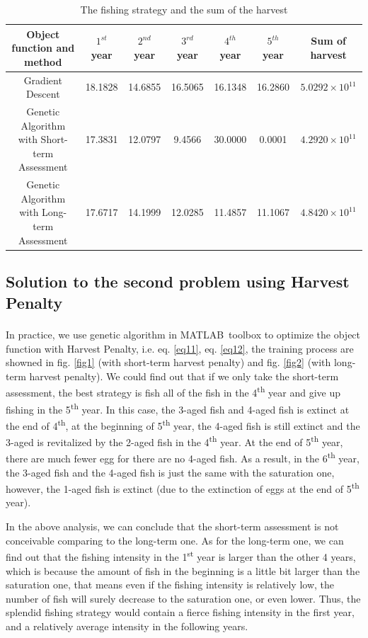 \documentclass{IEEEtran}
\begin{document}
\begin{table}
    \normalsize
    \caption{The fishing strategy and the sum of the harvest}
    \label{tab1}
    \begin{tabular}{ccccccc}\toprule
        Object function and method & $1^{st}$ year & $2^{nd}$ year & $3^{rd}$ year & $4^{th}$ year & $5^{th}$ year & Sum of harvest \\ 
        \midrule
        Gradient Descent & 18.1828 & 14.6855 & 16.5065 & 16.1348 & 16.2860 & $5.0292\times10^{11}$\\
        Genetic Algorithm with Short-term Assessment & 17.3831 & 12.0797 & 9.4566 & 30.0000 & 0.0001 & $4.2920\times10^{11}$\\ 
        Genetic Algorithm with Long-term Assessment & 17.6717 & 14.1999 & 12.0285 & 11.4857 & 11.1067 & $4.8420\times10^{11}$\\
        \bottomrule
    \end{tabular} 
\end{table}

\subsection{Solution to the second problem using Harvest Penalty}

In practice, we use genetic algorithm in MATLAB\textsuperscript\textregistered \ toolbox\textsuperscript{\cite{MATLABOptimizationToolbox}} to optimize the object function with Harvest Penalty, i.e. eq. \ref{eq11}, eq. \ref{eq12}, the training process are showned in fig. \ref{fig1} (with short-term harvest penalty) and fig. \ref{fig2} (with long-term harvest penalty). We could find out that if we only take the short-term assessment, the best strategy is fish all of the fish in the 4\textsuperscript{th} year and give up fishing in the 5\textsuperscript{th} year. In this case, the 3-aged fish and 4-aged fish is extinct at the end of 4\textsuperscript{th}, at the beginning of 5\textsuperscript{th} year, the 4-aged fish is still extinct and the 3-aged is revitalized by the 2-aged fish in the 4\textsuperscript{th} year. At the end of 5\textsuperscript{th} year, there are much fewer egg for there are no 4-aged fish. As a result, in the 6\textsuperscript{th} year, the 3-aged fish and the 4-aged fish is just the same with the saturation one, however, the 1-aged fish is extinct (due to the extinction of eggs at the end of 5\textsuperscript{th} year). 

In the above analysis, we can conclude that the short-term assessment is not conceivable comparing to the long-term one. As for the long-term one, we can find out that the fishing intensity in the 1\textsuperscript{st} year is larger than the other 4 years, which is because the amount of fish in the beginning is a little bit larger than the saturation one, that means even if the fishing intensity is relatively low, the number of fish will surely decrease to the saturation one, or even lower. Thus, the splendid fishing strategy would contain a fierce fishing intensity in the first year, and a relatively average intensity in the following years. 
\end{document}
